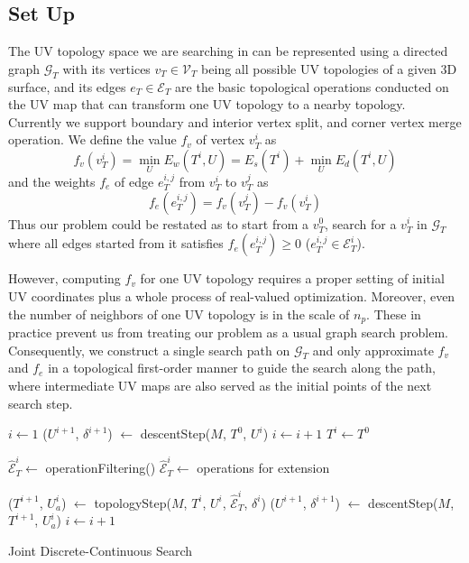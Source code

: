 \subsection{Set Up}

The UV topology space we are searching in can be represented using a directed graph $\mathcal{G}_T$ with its vertices $v_T \in \mathcal{V}_T$ being all possible UV topologies of a given 3D surface, and its edges $e_T \in \mathcal{E}_T$ are the basic topological operations conducted on the UV map that can transform one UV topology to a nearby topology. Currently we support boundary and interior vertex split, and corner vertex merge operation.
We define the value $f_v$ of vertex $v^i_T$ as 
\[ f_v(v^i_T) = \min_{U} E_w(T^i, U) = E_s(T^i) + \min_{U} E_d(T^i, U) \]
and the weights $f_e$ of edge $e^{i,j}_{T}$ from $v^i_T$ to $v^j_T$ as 
\[ f_e(e^{i,j}_T) = f_v(v^j_T) - f_v(v^i_T) \]
Thus our problem could be restated as to start from a $v^0_T$, search for a $v^i_T$ in $\mathcal{G}_T$ where all edges started from it satisfies $f_e(e^{i,j}_T) \geq 0$ ($e^{i,j}_T \in \mathcal{E}^i_T$).

However, computing $f_v$ for one UV topology requires a proper setting of initial UV coordinates plus a whole process of real-valued optimization. Moreover, even the number of neighbors of one UV topology is in the scale of $n_p$. These in practice prevent us from treating our problem as a usual graph search problem. Consequently, we construct a single search path on $\mathcal{G}_T$ and only approximate $f_v$ and $f_e$ in a topological first-order manner to guide the search along the path, where intermediate UV maps are also served as the initial points of the next search step.

\begin{algorithm}[h]
\SetAlgoLined
{}
$i \leftarrow 1$\;
{
	($U^{i+1}$, $\delta^{i+1}$) $\leftarrow$ descentStep($M$, $T^0$, $U^i$)\;
	$i \leftarrow i+1$\;
}
$T^i \leftarrow T^0$\;
{
	{
		$\hat{\mathcal{E}}^i_T \leftarrow$ operationFiltering()\;
	}
	{
		$\hat{\mathcal{E}}^i_T \leftarrow$ operations for extension\;
	}

	($T^{i+1}$, $U_a^{i}$) $\leftarrow$ topologyStep($M$, $T^i$, $U^i$, $\hat{\mathcal{E}}^i_T$, $\delta^i$)\;
	($U^{i+1}$, $\delta^{i+1}$) $\leftarrow$ descentStep($M$, $T^{i+1}$, $U_a^i$)\;
	$i \leftarrow i+1$\;
}
\caption{Joint Discrete-Continuous Search}
\label{alg:DCSearch}
\end{algorithm}


